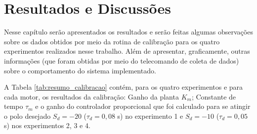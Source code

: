 \chapter[Resultados]{Resultados e Discussões}
\label{ch:resultados}




Nesse capítulo serão apresentados os resultados e serão feitas algumas observações sobre os dados obtidos por meio da rotina de calibração para os quatro experimentos realizados nesse trabalho. Além de apresentar, graficamente, outras informações (que foram obtidas por meio do telecomando de coleta de dados) sobre o comportamento do sistema implementado.



A Tabela \ref{tab:resumo_calibracao} contém, para os quatro experimentos e para cada motor, os resultados da calibração: Ganho da planta $K_m$; Constante de tempo $\tau_m$ e o ganho do controlador proporcional que foi calculado para se atingir o polo desejado $S_d = -20$ ($\tau_{d} = 0,08$ s) no experimento 1 e $S_d = -10$ ($\tau_{d} = 0,05$ s) nos experimentos 2, 3 e 4.

